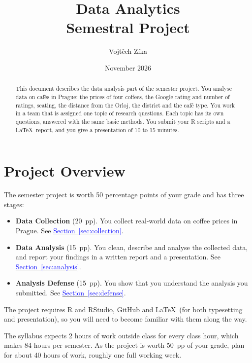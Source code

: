 \documentclass[11pt,a4paper]{article}
\title{\textbf{Data Analytics}\\[0.4ex]\large Semestral Project}
\author{Vojt\v{e}ch Zíka}
\date{November 2026}
\begin{document}
\maketitle

\begin{abstract}
\noindent This document describes the data analysis part of the semester project. You analyse data on caf\'es in Prague: the prices of four coffees, the Google rating and number of ratings, seating, the distance from the Orloj, the district and the caf\'e type. You work in a team that is assigned one topic of research questions. Each topic has its own questions, answered with the same basic methods. You submit your R scripts and a \LaTeX\ report, and you give a presentation of 10 to 15 minutes.
\end{abstract}

\clearpage
\tableofcontents

\clearpage

\section*{Project Overview}
The semester project is worth 50 percentage points of your grade and has three stages:

\begin{itemize}
	\item \textbf{Data Collection} (20~pp). You collect real-world data on coffee prices in Prague. See \hyperref[sec:collection]{\textcolor{blue}{Section~\ref*{sec:collection}}}.
	\item \textbf{Data Analysis} (15~pp). You clean, describe and analyse the collected data, and report your findings in a written report and a presentation. See \hyperref[sec:analysis]{\textcolor{blue}{Section~\ref*{sec:analysis}}}.
	\item \textbf{Analysis Defense} (15~pp). You show that you understand the analysis you submitted. See \hyperref[sec:defense]{\textcolor{blue}{Section~\ref*{sec:defense}}}.
\end{itemize}

The project requires R and RStudio, GitHub and \LaTeX\ (for both typesetting and presentation), so you will need to become familiar with them along the way.

The syllabus expects 2 hours of work outside class for every class hour, which makes 84 hours per semester. As the project is worth 50~pp of your grade, plan for about 40 hours of work, roughly one full working week.
\end{document}
